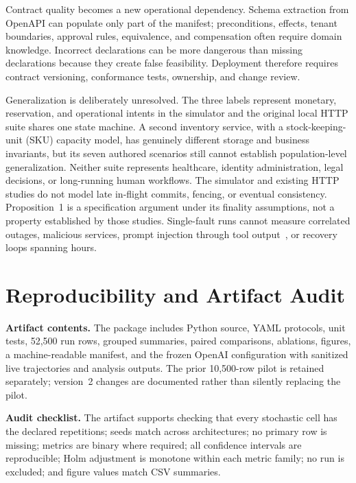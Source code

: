 \documentclass[10pt,journal,compsoc]{IEEEtran}
\begin{document}
Contract quality becomes a new operational dependency. Schema extraction from OpenAPI can populate only part of the manifest; preconditions, effects, tenant boundaries, approval rules, equivalence, and compensation often require domain knowledge. Incorrect declarations can be more dangerous than missing declarations because they create false feasibility. Deployment therefore requires contract versioning, conformance tests, ownership, and change review.

Generalization is deliberately unresolved. The three labels represent monetary, reservation, and operational intents in the simulator and the original local HTTP suite shares one state machine. A second inventory service, with a stock-keeping-unit (SKU) capacity model, has genuinely different storage and business invariants, but its seven authored scenarios still cannot establish population-level generalization. Neither suite represents healthcare, identity administration, legal decisions, or long-running human workflows. The simulator and existing HTTP studies do not model late in-flight commits, fencing, or eventual consistency. Proposition~1 is a specification argument under its finality assumptions, not a property established by those studies. Single-fault runs cannot measure correlated outages, malicious services, prompt injection through tool output~\cite{debenedetti2024agentdojo}, or recovery loops spanning hours.

\section{Reproducibility and Artifact Audit}\label{sec:repro}
\textbf{Artifact contents.} The package includes Python source, YAML protocols, unit tests, 52,500 run rows, grouped summaries, paired comparisons, ablations, figures, a machine-readable manifest, and the frozen OpenAI configuration with sanitized live trajectories and analysis outputs. The prior 10,500-row pilot is retained separately; version~2 changes are documented rather than silently replacing the pilot.

\textbf{Audit checklist.} The artifact supports checking that every stochastic cell has the declared repetitions; seeds match across architectures; no primary row is missing; metrics are binary where required; all confidence intervals are reproducible; Holm adjustment is monotone within each metric family; no run is excluded; and figure values match CSV summaries.
\end{document}
